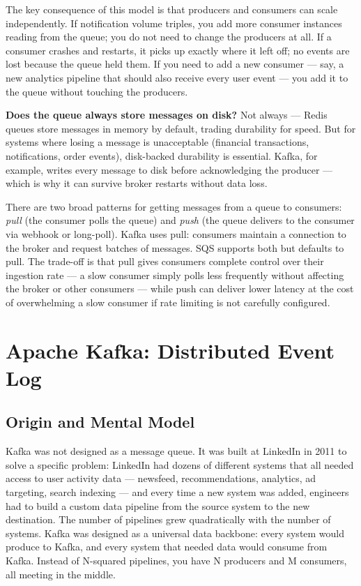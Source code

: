 \documentclass[11pt,a4paper]{article}
\begin{document}
The key consequence of this model is that producers and consumers can scale independently. If notification volume triples, you add more consumer instances reading from the queue; you do not need to change the producers at all. If a consumer crashes and restarts, it picks up exactly where it left off; no events are lost because the queue held them. If you need to add a new consumer --- say, a new analytics pipeline that should also receive every user event --- you add it to the queue without touching the producers.

\begin{thinkbox}
\textbf{Does the queue always store messages on disk?} Not always --- Redis queues store messages in memory by default, trading durability for speed. But for systems where losing a message is unacceptable (financial transactions, notifications, order events), disk-backed durability is essential. Kafka, for example, writes every message to disk before acknowledging the producer --- which is why it can survive broker restarts without data loss.
\end{thinkbox}

There are two broad patterns for getting messages from a queue to consumers: \textit{pull} (the consumer polls the queue) and \textit{push} (the queue delivers to the consumer via webhook or long-poll). Kafka uses pull: consumers maintain a connection to the broker and request batches of messages. SQS supports both but defaults to pull. The trade-off is that pull gives consumers complete control over their ingestion rate --- a slow consumer simply polls less frequently without affecting the broker or other consumers --- while push can deliver lower latency at the cost of overwhelming a slow consumer if rate limiting is not carefully configured.

\section{Apache Kafka: Distributed Event Log}

\subsection{Origin and Mental Model}

Kafka was not designed as a message queue. It was built at LinkedIn in 2011 to solve a specific problem: LinkedIn had dozens of different systems that all needed access to user activity data --- newsfeed, recommendations, analytics, ad targeting, search indexing --- and every time a new system was added, engineers had to build a custom data pipeline from the source system to the new destination. The number of pipelines grew quadratically with the number of systems. Kafka was designed as a universal data backbone: every system would produce to Kafka, and every system that needed data would consume from Kafka. Instead of N-squared pipelines, you have N producers and M consumers, all meeting in the middle.
\end{document}
